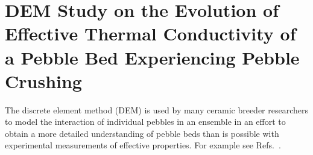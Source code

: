 \chapter{DEM Study on the Evolution of Effective Thermal Conductivity of a Pebble Bed Experiencing Pebble Crushing}\label{sec:dem-studies}
The discrete element method (DEM) is used by many ceramic breeder researchers to model the interaction of individual pebbles in an ensemble in an effort to obtain a more detailed understanding of pebble beds than is possible with experimental measurements of effective properties. For example see Refs.~\cite{An20071393, Lu2000, Zhao2010, Gan:2010uq, Annabattula2012a, VanLew2014}.


